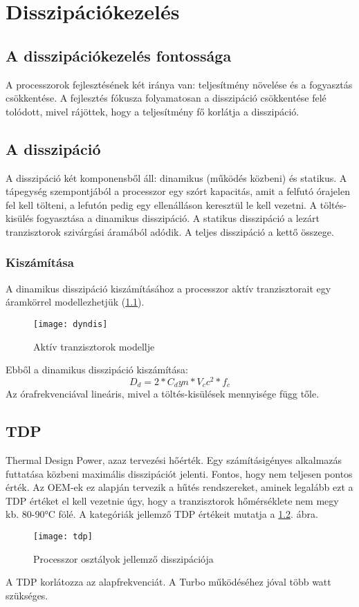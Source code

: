 
\chapter{Disszipációkezelés}

\section{A disszipációkezelés fontossága}
A processzorok fejlesztésének két iránya van: teljesítmény növelése és a fogyasztás csökkentése.
A fejlesztés fókusza folyamatosan a disszipáció csökkentése felé tolódott, mivel rájöttek, hogy a teljesítmény fő korlátja a disszipáció.

\section{A disszipáció}
A disszipáció két komponensből áll: dinamikus (működés közbeni) és statikus.
A tápegység szempontjából a processzor egy szórt kapacitás, amit a felfutó órajelen fel kell tölteni, a lefutón pedig egy ellenálláson keresztül le kell vezetni.
A töltés-kisülés fogyasztása a dinamikus disszipáció.
A statikus disszipáció a lezárt tranzisztorok szivárgási áramából adódik.
A teljes disszipáció a kettő összege.

\subsection{Kiszámítása}
A dinamikus disszipáció kiszámításához a processzor aktív tranzisztorait egy áramkörrel modellezhetjük (\ref{fig:dyndis}).
\begin{figure}[H]
    \texttt{[image: dyndis]}
    \centering
    \caption{Aktív tranzisztorok modellje}
    \label{fig:dyndis}
\end{figure}
Ebből a dinamikus disszipáció kiszámítása:
\begin{equation}
    D_d=2*C_dyn*V_cc^2*f_c
\end{equation}
Az órafrekvenciával lineáris, mivel a töltés-kisülések mennyisége függ tőle.

\section{TDP}
Thermal Design Power, azaz tervezési hőérték.
Egy számításigényes alkalmazás futtatása közbeni maximális disszipációt jelenti.
Fontos, hogy nem teljesen pontos érték.
Az OEM-ek ez alapján tervezik a hűtés rendszereket, aminek legalább ezt a TDP értéket el kell vezetnie úgy, hogy a tranzisztorok hőmérséklete nem megy kb. 80-90°C fölé.
A kategóriák jellemző TDP értékeit mutatja a \ref{fig:tdp}. ábra.
\begin{figure}[H]
    \texttt{[image: tdp]}
    \centering
    \caption{Processzor osztályok jellemző disszipációja}
    \label{fig:tdp}
\end{figure}
A TDP korlátozza az alapfrekvenciát.
A Turbo működéséhez jóval több watt szükséges.

